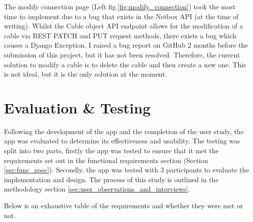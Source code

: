 \documentclass [11pt,a4paper]{article}
\begin{document}
The modify connection page (Left fig.\ref{fig:modify_connection}) took the most time to implement due to a bug that exists in the Netbox API (at the time of writing). Whilst the Cable object API endpoint allows for the modification of a cable via REST PATCH and PUT request methods, there exists a bug which causes a Django Exception. I raised a bug report on GitHub \cite{netboxBug} 2 months before the submission of this project, but it has not been resolved. Therefore, the current solution to modify a cable is to delete the cable and then create a new one. This is not ideal, but it is the only solution at the moment. 

\pagebreak

\section{Evaluation \& Testing}
\label{sec:evaluation}

Following the development of the app and the completion of the user study, the app was evaluated to determine its effectiveness and usability. The testing was split into two parts, firstly the app was tested to ensure that it met the requirements set out in the functional requirements section (Section \ref{sec:func_spec}). Secondly, the app was tested with 3 participants to evaluate the implementation and design. The process of this study is outlined in the methodology section \ref{sec:user_observations_and_interviews}. 

Below is an exhaustive table of the requirements and whether they were met or not.
\end{document}
